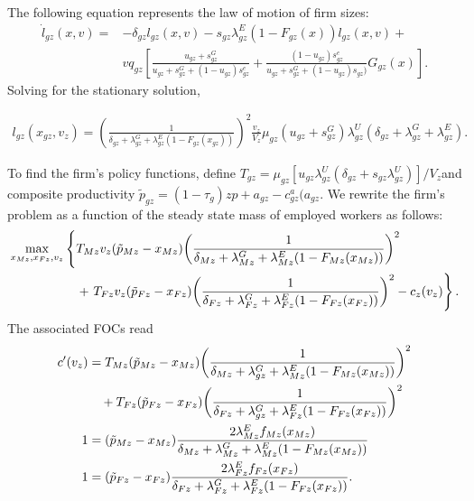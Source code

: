 The following equation represents the law of motion of firm sizes:
%
\begin{align}
    \dot{l}_{gz}(x,v) = & -\delta_{gz} l_{gz} (x,v) - s_{gz} \lambda_{gz}^{E} (1 - F_{gz}(x)) l_{gz} (x,v) + \\
    & v q_{gz} \left[ \frac{u_{gz} + s_{gz}^{G}}{u_{gz} + s_{gz}^{G} + (1 - u_{gz}) s_{gz}^e} + \frac{(1 - u_{gz}) s_{gz}^e}{u_{gz} + s_{gz}^{G} + (1-u_{gz}) s_{gz})} G_{gz}(x) \right].
\end{align}
%
Solving for the stationary solution,
%
\begin{small}
    \begin{align}
        \label{firmsizes_jointv}
        l_{gz}(x_{gz},v_{z}) = \left( \frac{1}{\delta_{gz} + \lambda_{gz}^{G} + \lambda_{gz}^{E} (1 - F_{gz}(x_{gz}))} \right)^2 \frac{v_{z}}{V_{z}} \mu_{gz} (u_{gz} + s_{gz}^{G}) \lambda_{gz}^{U} (\delta_{gz} + \lambda_{gz}^{G} + \lambda_{gz}^{E}).
    \end{align}
\end{small}
%
To find the firm's policy functions, define $T_{gz} = \mu_{gz} [u_{gz} \lambda_{gz}^{U} (\delta_{gz} + s_{gz} \lambda_{gz}^{U})] / V_{z}$and composite productivity $\tilde{p}_{gz} = (1 - \tau_g) z p + a_{gz} - c_{gz}^{a}(a_{gz}$. We rewrite the firm's problem as a function of the steady state mass of employed workers as follows:
%
\begin{align}
    \max_{x_{Mz},x_{Fz},v_{z}} &\left\{  T_{Mz} v_{z} (\tilde{p}_{Mz} - x_{Mz}) \biggl{(} \frac{1}{\delta_{Mz} + \lambda_{Mz}^{G} + \lambda_{Mz}^{E} (1 - F_{Mz}(x_{Mz}))} \biggr{)}^2 \right. \\
    & \quad + \left. T_{Fz} v_{z} (\tilde{p}_{Fz} - x_{Fz} ) \biggl{(} \frac{1}{\delta_{Fz} + \lambda_{Fz}^{G} + \lambda_{Fz}^{E} (1 - F_{Fz}(x_{Fz}))} \biggr{)}^2 - c_{z}(v_{z}) \right\}.
\end{align}
%
The associated FOCs read
%
\begin{align}
    c'(v_{z}) &= T_{Mz} (\tilde{p}_{Mz} - x_{Mz}) \biggl{(} \frac{1}{\delta_{Mz} + \lambda_{gz}^{G} + \lambda_{Mz}^{E} (1 - F_{Mz}(x_{Mz}))} \biggr{)}^2 \\
    & \quad + T_{Fz} (\tilde{p}_{Fz} - x_{Fz}) \biggl{(} \frac{1}{\delta_{Fz} + \lambda_{gz}^{G} + \lambda_{Fz}^{E} (1 - F_{Fz}(x_{Fz}))} \biggr{)}^2 \\
    1 &= (\tilde{p}_{Mz} - x_{Mz}) \frac{2 \lambda_{Mz}^{E} f_{Mz} (x_{Mz} )}{\delta_{Mz} + \lambda_{Mz}^{G} + \lambda_{Mz}^{E} (1 - F_{Mz}(x_{Mz}))} \\
    1 &= (\tilde{p}_{Fz} - x_{Fz}) \frac{2 \lambda_{Fz}^{E} f_{Fz} (x_{Fz} )}{\delta_{Fz} + \lambda_{Fz}^{G} + \lambda_{Fz}^{E} (1 - F_{Fz}(x_{Fz}))}.
\end{align}
%

